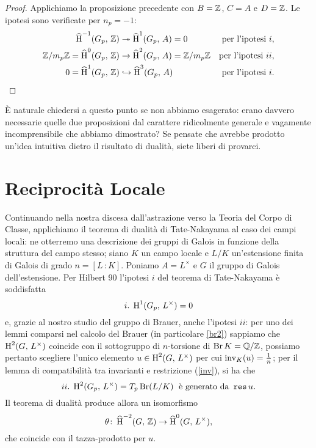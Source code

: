 \begin{proof}
	Applichiamo la proposizione precedente con $ B = \mathbb{Z} $, $ C = A $ e $ D = \mathbb{Z} $. Le ipotesi sono verificate per $ n_p = -1 $:
	\begin{align*}
		\operatorname{\widehat{H}}^{-1}(G_p,\, \mathbb{Z}) &\twoheadrightarrow \operatorname{\widehat{H}}^{1}(G_p,\, A) = 0 & \text{per l'ipotesi } i, \\
		\mathbb{Z}/m_p\mathbb{Z}=\operatorname{\widehat{H}}^{0}(G_p,\, \mathbb{Z}) &\to \operatorname{\widehat{H}}^{2}(G_p,\, A) = \mathbb{Z}/m_p\mathbb{Z} & \text{per l'ipotesi } ii,\\
		0 = \operatorname{\widehat{H}}^{1}(G_p,\, \mathbb{Z}) &\hookrightarrow \operatorname{\widehat{H}}^{3}(G_p,\, A) & \text{per l'ipotesi } i.
	\end{align*}
\end{proof}

È naturale chiedersi a questo punto se non abbiamo esagerato: erano davvero necessarie quelle due proposizioni dal carattere ridicolmente generale e vagamente incomprensibile che abbiamo dimostrato? Se pensate che avrebbe prodotto un'idea intuitiva dietro il risultato di dualità, siete liberi di provarci.

\section{Reciprocità Locale}


Continuando nella nostra discesa dall'astrazione verso la Teoria del Corpo di Classe, applichiamo il teorema di dualità di Tate-Nakayama al caso dei campi locali: ne otterremo una descrizione dei gruppi di Galois in funzione della struttura del campo stesso; siano $ K $ un campo locale e $ L / K  $ un'estensione finita di Galois di grado $ n = [L\,\colon K] $. Poniamo $ A = L^\times $ e $ G $ il gruppo di Galois dell'estensione. Per Hilbert 90 l'ipotesi $ i $ del teorema di Tate-Nakayama è soddisfatta 
\[ i. \; \operatorname{H}^1(G_p,\, L^\times) = 0 \]
e, grazie al nostro studio del gruppo di Brauer, anche l'ipotesi $ ii $: per uno dei lemmi comparsi nel calcolo del Brauer (in particolare \ref{br2}) sappiamo che $ \operatorname{H}^2(G, \, L^\times) $ coincide con il sottogruppo di $ n $-torsione di $ \operatorname{Br} K = \mathbb{Q}/\mathbb{Z} $, possiamo pertanto scegliere l'unico elemento $ u \in \operatorname{H}^2(G, \, L^\times) $ per cui $ \operatorname{inv}_K(u) = \frac{1}{n} $; per il lemma di compatibilità tra invarianti e restrizione (\ref{inv}), si ha che
\[ ii. \; \operatorname{H}^2(G_p, \, L^\times) = T_p \operatorname{Br}(L/K) \;\text{ è generato da } \operatorname{\mathtt{res}} u. \]
Il teorema di dualità produce allora un isomorfismo
\[ \theta\colon \operatorname{\widehat{H}}^{-2}(G, \, \mathbb{Z}) \to \operatorname{\widehat{H}}^{0}(G, \,  L^\times), \]
che coincide con il tazza-prodotto per $ u. $


